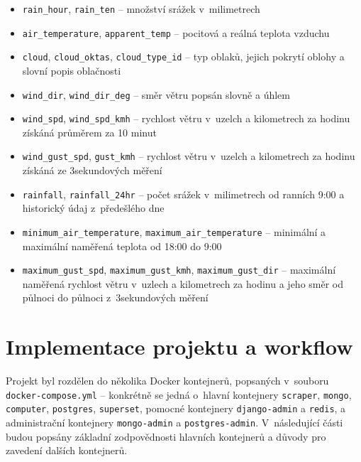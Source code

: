 \documentclass[10pt,a4paper,titlepage]{extarticle}
\begin{document}
\begin{itemize}
\begin{itemize}[label=\textperiodcentered]
            \item \texttt{rain\_hour}, \texttt{rain\_ten} -- množství srážek v~milimetrech
            \item \texttt{air\_temperature}, \texttt{apparent\_temp} -- pocitová a reálná teplota vzduchu
            \item \texttt{cloud}, \texttt{cloud\_oktas}, \texttt{cloud\_type\_id} -- typ oblaků, jejich pokrytí oblohy a slovní popis oblačnosti
            \item \texttt{wind\_dir}, \texttt{wind\_dir\_deg} -- směr větru popsán slovně a úhlem
            \item \texttt{wind\_spd}, \texttt{wind\_spd\_kmh} -- rychlost větru v~uzelch a kilometrech za hodinu získáná průměrem za 10 minut
            \item \texttt{wind\_gust\_spd}, \texttt{gust\_kmh} -- rychlost větru v~uzelch a kilometrech za hodinu získáná
            ze 3sekundových měření
            \item \texttt{rainfall}, \texttt{rainfall\_24hr} -- počet srážek v~milimetrech od ranních 9:00 a historický
            údaj z~předešlého dne
            \item \texttt{minimum\_air\_temperature}, \texttt{maximum\_air\_temperature} -- minimální a maximální naměřená teplota od 18:00 do 9:00
            \item \texttt{maximum\_gust\_spd}, \texttt{maximum\_gust\_kmh}, \texttt{maximum\_gust\_dir} -- maximální
            naměřená rychlost větru v~uzlech a kilometrech za hodinu a jeho směr od půlnoci do půlnoci z~3sekundových měření
        \end{itemize}
    \end{itemize}

    \section{Implementace projektu a workflow}

    Projekt byl rozdělen do několika Docker kontejnerů, popsaných v~souboru
    \mbox{\texttt{docker-compose.yml}}
    -- konkrétně se jedná o~hlavní kontejnery
    \texttt{scraper}, \texttt{mongo}, \texttt{computer}, \texttt{postgres},
    \texttt{superset}, pomocné kontejnery \texttt{django-admin} a \texttt{redis},
    a administrační kontejnery \texttt{mongo-admin} a \texttt{postgres-admin}.
    V~následující části budou popsány základní zodpovědnosti hlavních kontejnerů a důvody pro zavedení dalších
    kontejnerů.
\end{document}
